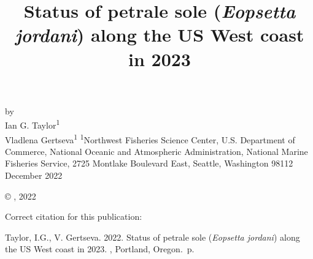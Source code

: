 \documentclass[11pt,
  english,
  letterpaper,
]{article}
\date{}
\newcommand{\trTitle}{Status of petrale sole (\emph{Eopsetta jordani}) along the US West coast in 2023}
\newcommand{\trYear}{2022}
\newcommand{\trMonth}{December}
\newcommand{\trAuthsBack}{Taylor, I.G., V. Gertseva}
\newcommand{\trCitation}{
\begin{hangparas}{1em}{1}
\trAuthsBack{}. \trYear{}. \trTitle{}. \glsentrylong{pfmc}, Portland, Oregon. \pageref{LastPage}{}\,p.
\end{hangparas}}
\begin{document}

\renewcommand*{\thefootnote}{\fnsymbol{footnote}}

\small
\thispagestyle{empty}
\noindent
\begin{center}
\title{Status of petrale sole (\emph{Eopsetta jordani}) along the US West coast in 2023}
\vspace{1.5cm}
{\Large\textbf{}}
\vfill
by\\
Ian G. Taylor\textsuperscript{1}\\
Vladlena Gertseva\textsuperscript{1}\vfill
\textsuperscript{1}Northwest Fisheries Science Center, U.S. Department of Commerce, National Oceanic and Atmospheric Administration, National Marine Fisheries Service, 2725 Montlake Boulevard East, Seattle, Washington 98112\vfill
\trMonth{} \trYear{}
\end{center}
\clearpage

\thispagestyle{empty}
\vspace*{\fill}
\begin{center}
\copyright{} , \trYear{}\\
\end{center}
\par
\bigskip
\noindent
Correct citation for this publication:
\bigskip
\par
\trCitation{}
\clearpage


\tableofcontents\clearpage
\label{TRlastRoman}
\clearpage

\newpage
\thispagestyle{empty} %

\pagestyle{plain}  %
\renewcommand*{\thefootnote}{\arabic{footnote}}  %
\setcounter{footnote}{0}  %
\renewcommand{\headrulewidth}{0.5pt}
\renewcommand{\footrulewidth}{0.5pt}

\newcommand{\lt}{\ensuremath <}
\newcommand{\gt}{\ensuremath >}
\end{document}
